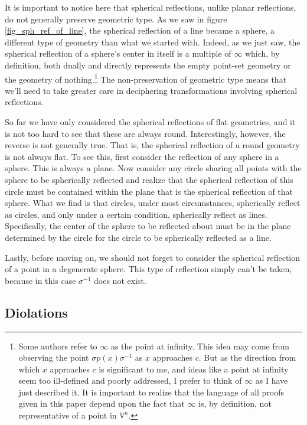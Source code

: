 \documentclass[12pt]{article}
\newcommand{\V}{\mathbb{V}}
\newcommand{\nvai}{\infty}
\begin{document}
It is important to notice here that spherical reflections, unlike planar reflections, do
not generally preserve geometric type.  As we saw in figure \ref{fig_sph_ref_of_line},
the spherical reflection of a line became a sphere, a different type of geometry than
what we started with.  Indeed, as we just saw, the spherical reflection of a sphere's
center in itself is a multiple of $\nvai$ which, by definition, both dually and directly represents
the empty point-set geometry or the geometry of nothing.\footnote{Some authors refer to $\nvai$ as the point at
infinity.  This idea may come from observing the point $\sigma p(x)\sigma^{-1}$ as $x$
approaches $c$.  But as the direction from which $x$ approaches $c$ is significant to me,
and ideas like a point at infinity seem too ill-defined and poorly addressed, I prefer to think of $\nvai$
as I have just described it.  It is important to realize that the language of all proofs given in this
paper depend upon the fact that $\nvai$ is, by definition, not representative of a point in $\V^n$.}
The non-preservation of geometric type means that we'll need
to take greater care in deciphering transformations involving spherical reflections.

So far we have only considered the spherical reflections of flat geometries, and it is
not too hard to see that these are always round.  Interestingly, however, the reverse
is not generally true.  That is, the spherical reflection of a round geometry is not
always flat.  To see this, first consider the reflection of any sphere in a sphere.
This is always a plane.  Now consider any circle sharing all points with the sphere to be
spherically reflected and realize that the spherical reflection of this circle must be
contained within the plane that is the spherical reflection of that sphere.  What we find is
that circles, under most circumstances, spherically reflect as circles, and only
under a certain condition, spherically reflect as lines.  Specifically, the center
of the sphere to be reflected about must be in the plane determined by the
circle for the circle to be spherically reflected as a line.

Lastly, before moving on, we should not forget to
consider the spherical reflection of a point in a degenerate sphere.  This
type of reflection simply can't be taken, because in this case $\sigma^{-1}$ does not exist.

\subsection{Diolations}
\end{document}
